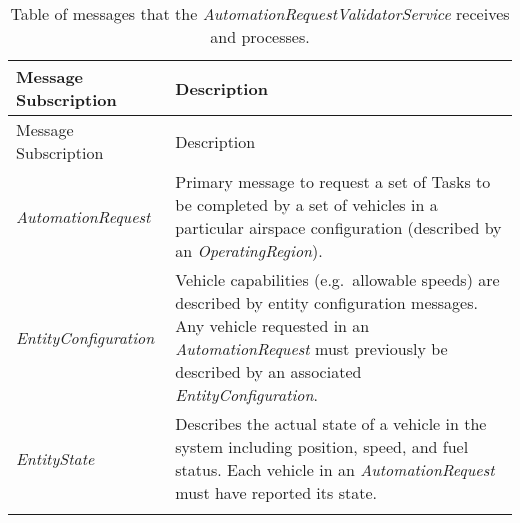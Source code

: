 \begin{longtable}[c]{@{}ll@{}}
\caption{Table of messages that the
\emph{AutomationRequestValidatorService} receives and
processes.}\tabularnewline
\toprule
\begin{minipage}[b]{0.29\columnwidth}\raggedright\strut
Message Subscription
\strut\end{minipage} &
\begin{minipage}[b]{0.65\columnwidth}\raggedright\strut
Description
\strut\end{minipage}\tabularnewline
\midrule
\endfirsthead
\toprule
\begin{minipage}[b]{0.29\columnwidth}\raggedright\strut
Message Subscription
\strut\end{minipage} &
\begin{minipage}[b]{0.65\columnwidth}\raggedright\strut
Description
\strut\end{minipage}\tabularnewline
\midrule
\endhead
\begin{minipage}[t]{0.29\columnwidth}\raggedright\strut
\emph{AutomationRequest}
\strut\end{minipage} &
\begin{minipage}[t]{0.65\columnwidth}\raggedright\strut
Primary message to request a set of Tasks to be completed by a set of
vehicles in a particular airspace configuration (described by an
\emph{OperatingRegion}).
\strut\end{minipage}\tabularnewline
\begin{minipage}[t]{0.29\columnwidth}\raggedright\strut
\emph{EntityConfiguration}
\strut\end{minipage} &
\begin{minipage}[t]{0.65\columnwidth}\raggedright\strut
Vehicle capabilities (e.g.~allowable speeds) are described by entity
configuration messages. Any vehicle requested in an
\emph{AutomationRequest} must previously be described by an associated
\emph{EntityConfiguration}.
\strut\end{minipage}\tabularnewline
\begin{minipage}[t]{0.29\columnwidth}\raggedright\strut
\emph{EntityState}
\strut\end{minipage} &
\begin{minipage}[t]{0.65\columnwidth}\raggedright\strut
Describes the actual state of a vehicle in the system including
position, speed, and fuel status. Each vehicle in an
\emph{AutomationRequest} must have reported its state.
\strut\end{minipage}\tabularnewline
\begin{minipage}[t]{0.29\columnwidth}\raggedright\strut

\end{minipage}
\end{longtable}

